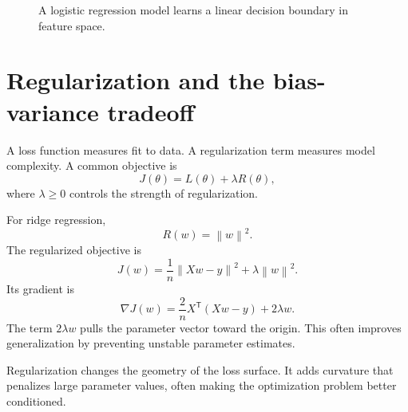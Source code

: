 \documentclass[11pt,oneside]{book}
\newcommand{\grad}{\nabla}
\newcommand{\norm}[1]{\left\lVert #1\right\rVert}
\newcommand{\T}{^{\mathsf T}}
\begin{document}
\begin{figure}[H]
\centering
{}
\caption{A logistic regression model learns a linear decision boundary in feature space.}
\end{figure}

\section{Regularization and the bias-variance tradeoff}

A loss function measures fit to data. A regularization term measures model complexity. A common objective is
\[
J(\theta)=L(\theta)+\lambda R(\theta),
\]
where $\lambda\ge0$ controls the strength of regularization.

For ridge regression,
\[
R(w)=\norm{w}^2.
\]
The regularized objective is
\[
J(w)=\frac1n\norm{Xw-y}^2+\lambda\norm{w}^2.
\]
Its gradient is
\[
\grad J(w)=\frac2n X\T(Xw-y)+2\lambda w.
\]
The term $2\lambda w$ pulls the parameter vector toward the origin. This often improves generalization by preventing unstable parameter estimates.

\begin{mainideabox}
Regularization changes the geometry of the loss surface. It adds curvature that penalizes large parameter values, often making the optimization problem better conditioned.
\end{mainideabox}
\end{document}
